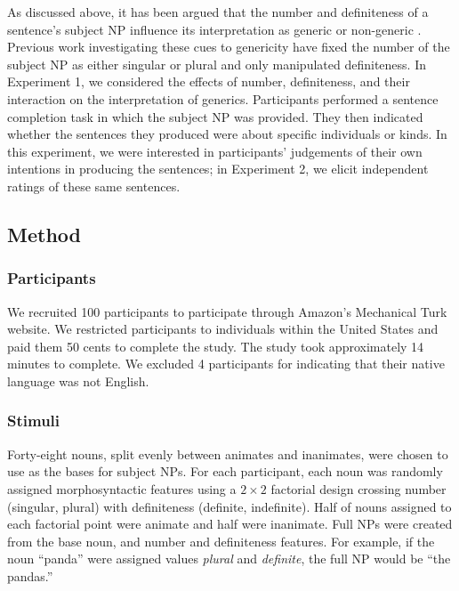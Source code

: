 \documentclass[10pt,letterpaper]{article}
\begin{document}
As discussed above, it has been argued that the number and definiteness of a sentence's subject NP influence its interpretation as generic or non-generic \cite{Carlson:1977,Krifka:1995,Lyons:1977}. Previous work investigating these cues to genericity have fixed the number of the subject NP as either singular \cite{Cimpian:2011} or plural \cite{Gelman:2003} and only manipulated definiteness. In Experiment 1, we considered the effects of number, definiteness, and their interaction on the interpretation of generics. Participants performed a sentence completion task in which the subject NP was provided. They then indicated whether the sentences they produced were about specific individuals or kinds. In this experiment, we were interested in participants' judgements of their own intentions in producing the sentences; in Experiment 2, we elicit independent ratings of these same sentences.

\subsection{Method}

\subsubsection{Participants}

We recruited 100 participants to participate through Amazon's Mechanical Turk website. We restricted participants to individuals within the United States and paid them 50 cents to complete the study. The study took approximately 14 minutes to complete. We excluded 4 participants for indicating that their native language was not English.

\subsubsection{Stimuli}

Forty-eight nouns, split evenly between animates and inanimates, were chosen to use as the bases for subject NPs. For each participant, each noun was randomly assigned morphosyntactic features using a \(2 \times 2\) factorial design crossing number (singular, plural) with definiteness (definite, indefinite). Half of nouns assigned to each factorial point were animate and half were inanimate. Full NPs were created from the base noun, and number and definiteness features. For example, if the noun ``panda'' were assigned values \textit{plural} and \textit{definite}, the full NP would be ``the pandas.''
\end{document}
